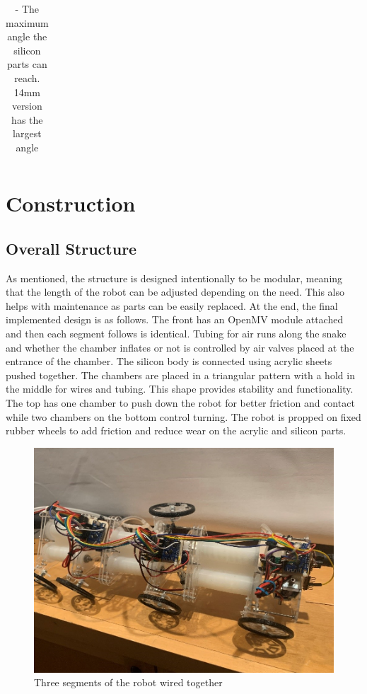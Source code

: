 \documentclass[twoside]{article}
\begin{document}
\begin{table} [H]
\begin{tabular}{|c|c|}
	\hline
	\end{tabular}
	\caption{- The maximum angle the silicon parts can reach. 14mm version has the largest angle}
\end{table}

\section{Construction}

\subsection{Overall Structure}
As mentioned, the structure is designed intentionally to be modular, meaning that the length of the robot can be adjusted depending on the need. This also helps with maintenance as parts can be easily replaced. At the end, the final implemented design is as follows. The front has an OpenMV module attached and then each segment follows is identical. Tubing for air runs along the snake and whether the chamber inflates or not is controlled by air valves placed at the entrance of the chamber. The silicon body is connected using acrylic sheets pushed together. The chambers are placed in a triangular pattern with a hold in the middle for wires and tubing. This shape provides stability and functionality. The top has one chamber to push down the robot for better friction and contact while two chambers on the bottom control turning. The robot is propped on fixed rubber wheels to add friction and reduce wear on the acrylic and silicon parts. 

\begin{figure} [H]
	\centering
	\includegraphics{completed_snake}
	\caption{Three segments of the robot wired together}
\end{figure}
\end{document}
